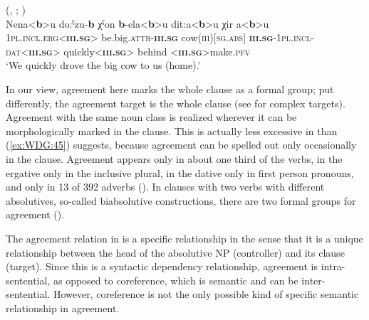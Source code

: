 \documentclass[output=collectionpaper]{langsci/langscibook}
\begin{document}
\ea\label{ex:WDG:45}
 (, ; \citealt[3]{Bond2016})\\
\gll Nena<\textbf{b}>u	do:ˁzu-\textbf{b}	χˁon \textbf{b}-ela<\textbf{b}>u	dit:a<\textbf{b}>u	χir	a<\textbf{b}>u\\
\textsc{1pl.incl.erg}<\textbf{\textsc{iii.sg}}>	be.big.\textsc{attr}-\textbf{\textsc{iii.sg}}	cow(\textsc{iii})[\textsc{sg.abs}] \textbf{\textsc{iii.sg}}-\textsc{1pl.incl-dat}<\textbf{\textsc{iii.sg}}>	quickly<\textbf{\textsc{iii.sg}}>	behind	<\textbf{\textsc{iii.sg}}>make.\textsc{pfv} \\
\glt `We quickly drove the big cow to us (home).'\\
\z

In our view, agreement here marks the whole clause as a formal group; put differently, the agreement target is the whole clause (see  for complex targets). Agreement with the same noun class is realized wherever it can be morphologically marked in the clause. This is actually less excessive in  than (\ref{ex:WDG:45}) suggests, because agreement can be spelled out only occasionally in the  clause. Agreement appears only in about one third of the verbs, in the ergative only in the inclusive plural, in the dative only in first person pronouns, and only in 13 of 392 adverbs (\citealt[70]{Bond2016}). In clauses with two verbs with different absolutives, so-called biabsolutive constructions, there are two formal groups for agreement (\citealt[90--111]{Chumakina2016}).

The agreement relation in  is a specific relationship in the sense that it is a unique relationship between the head of the absolutive NP (controller) and its clause (target). Since this is a syntactic dependency relationship,  agreement is intra-sentential, as opposed to coreference, which is semantic and can be inter-sentential. However, coreference is not the only possible kind of specific semantic relationship in agreement.
\end{document}
